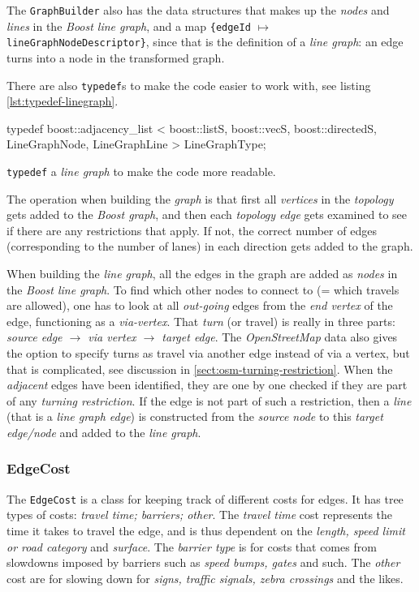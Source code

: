 \documentclass[../main.tex]{subfiles}
\begin{document}
The \texttt{GraphBuilder} also has the data structures that makes up the \textit{nodes} and \textit{lines} in the \textit{Boost line graph}, and a map \texttt{\{edgeId} $\mapsto$ \texttt{lineGraphNodeDescriptor\}}, since that is the definition of a \textit{line graph}: an edge turns into a node in the transformed graph.

There are also \texttt{typedef}s to make the code easier to work with, see listing \ref{lst:typedef-linegraph}.

\begin{mylisting}
\begin{cppcode}
typedef boost::adjacency_list
   < boost::listS, boost::vecS, boost::directedS,
    LineGraphNode, LineGraphLine >                             LineGraphType;
\end{cppcode}
\caption{\texttt{typedef} a \textit{line graph} to make the code more readable.}
\label{lst:typedef-linegraph}
\end{mylisting}

The operation when building the \textit{graph} is that first all \textit{vertices} in the \textit{topology} gets added to the \textit{Boost graph}, and then each \textit{topology edge} gets examined to see if there are any restrictions that apply. If not, the correct number of edges (corresponding to the number of lanes) in each direction gets added to the graph.

When building the \textit{line graph}, all the edges in the graph are added as \textit{nodes} in the \textit{Boost line graph}. To find which other nodes to connect to (= which travels are allowed), one has to look at all \textit{out-going} edges from the \textit{end vertex} of the edge, functioning as a \textit{via-vertex}. That \textit{turn} (or travel) is really in three parts: \textit{source edge $\rightarrow$ via vertex $\rightarrow$ target edge}. The \textit{OpenStreetMap} data also gives the option to specify turns as travel via another edge instead of via a vertex, but that is complicated, see discussion in \ref{sect:osm-turning-restriction}. When the \textit{adjacent} edges have been identified, they are one by one checked if they are part of any \textit{turning restriction}. If the edge is not part of such a restriction, then a \textit{line} (that is a \textit{line graph edge}) is constructed from the \textit{source node} to this \textit{target edge/node} and added to the \textit{line graph}.

\subsubsection{EdgeCost}
The \texttt{EdgeCost} is a class for keeping track of different costs for edges. It has tree types of costs: \textit{travel time; barriers; other}. The \textit{travel time} cost represents the time it takes to travel the edge, and is thus dependent on the \textit{length, speed limit or road category} and \textit{surface}. The \textit{barrier type} is for costs that comes from slowdowns imposed by barriers such as \textit{speed bumps, gates} and such. The \textit{other} cost are for slowing down for \textit{signs, traffic signals, zebra crossings} and the likes.
\end{document}
